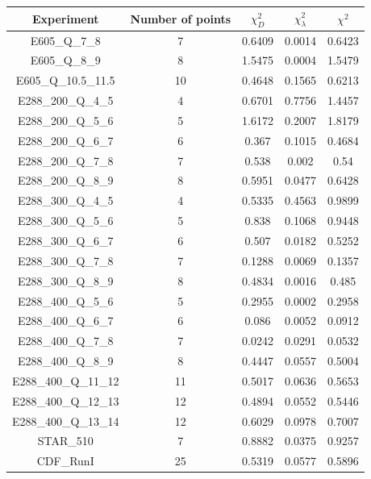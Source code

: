 \documentclass[
]{article}
\begin{document}
\begin{table}[h]

\centering

\begin{tabular}{|c|c|c|c|c|} \hline

\textbf{Experiment} & \textbf{Number of
points} & \textbf{\(\chi_{D}^2\)} & \textbf{\(\chi_{\lambda}^2\)} & \textbf{\(\chi^2\)} \\ \hline

E605\_Q\_7\_8 & 7 & 0.6409 & 0.0014 & 0.6423 \\ \hline
E605\_Q\_8\_9 & 8 & 1.5475 & 0.0004 & 1.5479 \\ \hline
E605\_Q\_10.5\_11.5 & 10 & 0.4648 & 0.1565 & 0.6213 \\ \hline
E288\_200\_Q\_4\_5 & 4 & 0.6701 & 0.7756 & 1.4457 \\ \hline
E288\_200\_Q\_5\_6 & 5 & 1.6172 & 0.2007 & 1.8179 \\ \hline
E288\_200\_Q\_6\_7 & 6 & 0.367 & 0.1015 & 0.4684 \\ \hline
E288\_200\_Q\_7\_8 & 7 & 0.538 & 0.002 & 0.54 \\ \hline
E288\_200\_Q\_8\_9 & 8 & 0.5951 & 0.0477 & 0.6428 \\ \hline
E288\_300\_Q\_4\_5 & 4 & 0.5335 & 0.4563 & 0.9899 \\ \hline
E288\_300\_Q\_5\_6 & 5 & 0.838 & 0.1068 & 0.9448 \\ \hline
E288\_300\_Q\_6\_7 & 6 & 0.507 & 0.0182 & 0.5252 \\ \hline
E288\_300\_Q\_7\_8 & 7 & 0.1288 & 0.0069 & 0.1357 \\ \hline
E288\_300\_Q\_8\_9 & 8 & 0.4834 & 0.0016 & 0.485 \\ \hline
E288\_400\_Q\_5\_6 & 5 & 0.2955 & 0.0002 & 0.2958 \\ \hline
E288\_400\_Q\_6\_7 & 6 & 0.086 & 0.0052 & 0.0912 \\ \hline
E288\_400\_Q\_7\_8 & 7 & 0.0242 & 0.0291 & 0.0532 \\ \hline
E288\_400\_Q\_8\_9 & 8 & 0.4447 & 0.0557 & 0.5004 \\ \hline
E288\_400\_Q\_11\_12 & 11 & 0.5017 & 0.0636 & 0.5653 \\ \hline
E288\_400\_Q\_12\_13 & 12 & 0.4894 & 0.0552 & 0.5446 \\ \hline
E288\_400\_Q\_13\_14 & 12 & 0.6029 & 0.0978 & 0.7007 \\ \hline
STAR\_510 & 7 & 0.8882 & 0.0375 & 0.9257 \\ \hline
CDF\_RunI & 25 & 0.5319 & 0.0577 & 0.5896 \\ \hline

\end{tabular}
\end{table}
\end{document}
